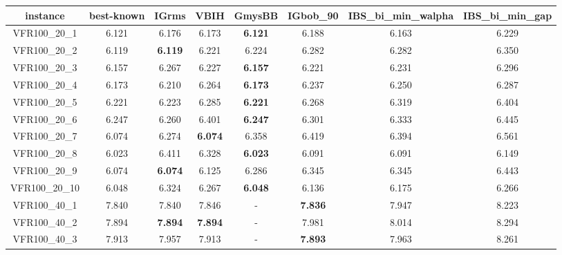 \begin{tabular}{cc|ccc|ccc}
instance & best-known & IGrms & VBIH & GmysBB & IGbob\_90 & IBS\_bi\_min\_walpha & IBS\_bi\_min\_gap \\ 
 \hline 
VFR100\_20\_1      & 6.121            & 6.176            & 6.173            & {\bf 6.121}      & 6.188            & 6.163            & 6.229           \\ 
VFR100\_20\_2      & 6.119            & {\bf 6.119}      & 6.221            & 6.224            & 6.282            & 6.282            & 6.350           \\ 
VFR100\_20\_3      & 6.157            & 6.267            & 6.227            & {\bf 6.157}      & 6.221            & 6.231            & 6.296           \\ 
VFR100\_20\_4      & 6.173            & 6.210            & 6.264            & {\bf 6.173}      & 6.237            & 6.250            & 6.287           \\ 
VFR100\_20\_5      & 6.221            & 6.223            & 6.285            & {\bf 6.221}      & 6.268            & 6.319            & 6.404           \\ 
VFR100\_20\_6      & 6.247            & 6.260            & 6.401            & {\bf 6.247}      & 6.301            & 6.333            & 6.445           \\ 
VFR100\_20\_7      & 6.074            & 6.274            & {\bf 6.074}      & 6.358            & 6.419            & 6.394            & 6.561           \\ 
VFR100\_20\_8      & 6.023            & 6.411            & 6.328            & {\bf 6.023}      & 6.091            & 6.091            & 6.149           \\ 
VFR100\_20\_9      & 6.074            & {\bf 6.074}      & 6.125            & 6.286            & 6.345            & 6.345            & 6.443           \\ 
VFR100\_20\_10     & 6.048            & 6.324            & 6.267            & {\bf 6.048}      & 6.136            & 6.175            & 6.266           \\ 
VFR100\_40\_1      & 7.840            & 7.840            & 7.846            & -                & {\bf 7.836}      & 7.947            & 8.223           \\ 
VFR100\_40\_2      & 7.894            & {\bf 7.894}      & {\bf 7.894}      & -                & 7.981            & 8.014            & 8.294           \\ 
VFR100\_40\_3      & 7.913            & 7.957            & 7.913            & -                & {\bf 7.893}      & 7.963            & 8.261           \\ 

\end{tabular}
